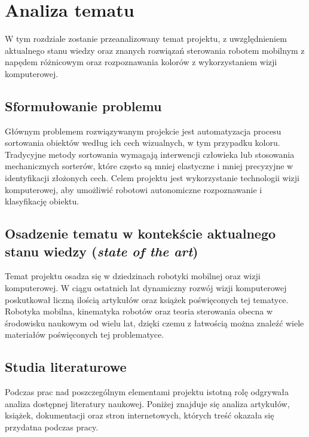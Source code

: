 \chapter{Analiza tematu}
\label{ch:analiza}

W tym rozdziale zostanie przeanalizowany temat projektu, z uwzględnieniem aktualnego stanu wiedzy oraz znanych rozwiązań sterowania robotem mobilnym z napędem różnicowym oraz rozpoznawania kolorów z wykorzystaniem wizji komputerowej.

\section{Sformułowanie problemu}
\label{sec:sformulowanie_problemu}

Głównym problemem rozwiązywanym projekcie jest automatyzacja procesu sortowania obiektów według ich cech wizualnych, w tym przypadku koloru. Tradycyjne metody sortowania wymagają interwencji człowieka lub stosowania mechanicznych sorterów, które często są mniej elastyczne i mniej precyzyjne w identyfikacji złożonych cech. Celem projektu jest wykorzystanie technologii wizji komputerowej, aby umożliwić robotowi autonomiczne rozpoznawanie i klasyfikację obiektu.

\section{Osadzenie tematu w kontekście aktualnego stanu wiedzy (\textit{state of the art})}
\label{sec:state_of_the_art}

Temat projektu osadza się w dziedzinach robotyki mobilnej oraz wizji komputerowej. W ciągu ostatnich lat dynamiczny rozwój wizji komputerowej poskutkował liczną ilością artykułów oraz książek poświęconych tej tematyce. Robotyka mobilna, kinematyka robotów oraz teoria sterowania obecna w środowisku naukowym od wielu lat, dzięki czemu z łatwością można znaleźć wiele materiałów poświęconych tej problematyce. 

\section{Studia literaturowe}
\label{sec:studia_literaturowe}

Podczas prac nad poszczególnym elementami projektu istotną rolę odgrywała analiza dostępnej literatury naukowej. Poniżej znajduje się analiza artykułów, książek, dokumentacji oraz stron internetowych, których treść okazała się przydatna podczas pracy. 

